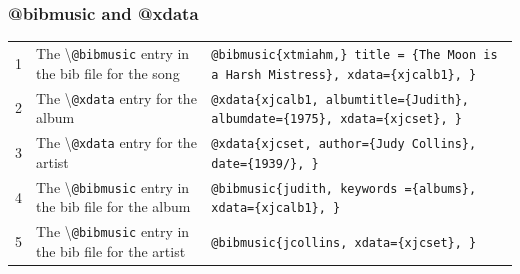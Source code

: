 \documentclass{article}
\newcommand\showcmnd[1]{%
\textbackslash\texttt{#1}%
}
\begin{document}
\subsubsection{@bibmusic and @xdata}
\begin{center}
\begin{tabular}{c|p{}|p{}|}
\hline
1 & The \showcmnd{@bibmusic} entry in the bib file for the song &
 \texttt{@bibmusic\{xtmiahm,\} \newline
title = \{The Moon is a Harsh Mistress\}, \newline 
xdata=\{xjcalb1\}, \newline 
 \}} \newline \\
2 & The \showcmnd{@xdata} entry for the album &
\texttt{@xdata\{xjcalb1, \newline
albumtitle=\{Judith\}, \newline
albumdate=\{1975\}, \newline
xdata=\{xjcset\}, \newline
\}} \newline
\\
3 & The \showcmnd{@xdata} entry for the artist  & 
\texttt{@xdata\{xjcset, \newline
author=\{Judy Collins\}, \newline
date=\{1939/{}\}, \newline
\}} \newline
 \\
4 & The \showcmnd{@bibmusic} entry in the bib file for the album &
 \texttt{@bibmusic\{judith, \newline
keywords =\{albums\}, \newline
xdata=\{xjcalb1\}, \newline
 \}} \newline \\
5 & The \showcmnd{@bibmusic} entry in the bib file for the artist &
 \texttt{@bibmusic\{jcollins, \newline
xdata=\{xjcset\}, \newline
 \}} \newline \\
\hline
\end{tabular}
\end{center}
\end{document}
